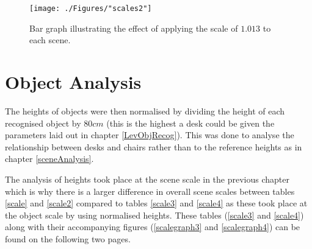 \clearpage
\begin{figure}[h!]
	\centering
	\texttt{[image: ./Figures/"scales2"]}
	\caption[Bar graph illustrating the effect of scaling the scenes]{Bar graph illustrating the effect of applying the scale of $1.013$ to each scene. \label{scalegraph2}}
\end{figure}

\section{Object Analysis \label{objectanalysis}}

The heights of objects were then normalised by dividing the height of each recognised object by $80cm$ (this is the highest a desk could be given the parameters laid out in chapter \ref{LevObjRecog}). This was done to analyse the relationship between desks and chairs rather than to the reference heights as in chapter \ref{sceneAnalysis}. 

The analysis of heights took place at the scene scale in the previous chapter which is why there is a larger difference in overall scene scales between tables \ref{scale} and \ref{scale2} compared to tables \ref{scale3} and \ref{scale4} as these took place at the object scale by using normalised heights. These tables (\ref{scale3} and \ref{scale4}) along with their accompanying figures (\ref{scalegraph3} and \ref{scalegraph4}) can be found on the following two pages.

